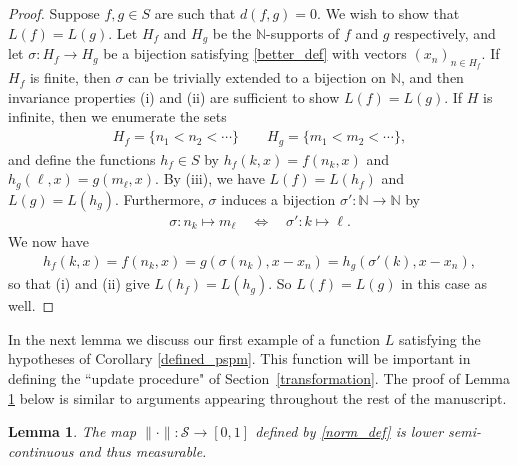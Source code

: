 \documentclass[11pt,reqno]{amsart}
\numberwithin{equation}{section}
\newtheorem{lemma}[thm]{Lemma}
\theoremstyle{definition}
\begin{document}
\begin{proof}
Suppose $f,g \in S$ are such that $d(f,g) = 0$.
We wish to show that $L(f) = L(g)$.
Let $H_f$ and $H_g$ be the ${\mathbb{N}}$-supports of $f$ and $g$ respectively, and let $\sigma : H_f \to H_g$ be a bijection satisfying \eqref{better_def} with vectors $(x_n)_{n \in H_f}$.
If $H_f$ is finite, then $\sigma$ can be trivially extended to a bijection on ${\mathbb{N}}$, and then invariance properties (i) and (ii) are sufficient to show $L(f) = L(g)$.
If $H$ is infinite, then we enumerate the sets
{\begin{align*} {
H_f = \{n_1 < n_2 < \cdots\} \qquad H_g = \{m_1 < m_2 < \cdots\},
} \end{align*}}
and define the functions $h_f \in S$ by $h_f(k,x) = f(n_k,x)$ and $h_g(\ell,x) = g(m_\ell,x)$.
By (iii), we have $L(f) = L(h_f)$ and $L(g) = L(h_g)$.
Furthermore, $\sigma$ induces a bijection $\sigma' : {\mathbb{N}} \to {\mathbb{N}}$ by
{\begin{align*} {
\sigma : n_k \mapsto m_\ell \quad \Leftrightarrow \quad \sigma' : k \mapsto \ell.
} \end{align*}}
We now have
{\begin{align*} {
h_f(k,x) = f(n_k,x) = g(\sigma(n_k),x - x_n) = h_g(\sigma'(k),x - x_n),
} \end{align*}}
so that (i) and (ii) give $L(h_f) = L(h_g)$.
So $L(f) = L(g)$ in this case as well.
\end{proof}

In the next lemma we discuss our first example of a function $L$ satisfying the hypotheses of Corollary \ref{defined_pspm}.
This function will be important in defining the ``update procedure" of Section~\ref{transformation}. 
The proof of Lemma \ref{norm_equivalence} below is similar to arguments appearing throughout the rest of the manuscript.

\begin{lemma} \label{norm_equivalence}
The map $\|\cdot\| : {\mathcal{S}} \to [0,1]$ defined by \eqref{norm_def} is lower semi-continuous and thus measurable.
\end{lemma}
\end{document}
